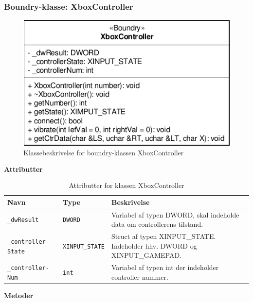 \subsubsection{Boundry-klasse: XboxController}

\begin{figure}[h]
\centering
\includegraphics[]{../fig/diagrammer/pc/cd_xboxcontroller.pdf}
\caption{Klassebeskrivelse for boundry-klassen XboxController}
\label{fig:cd_data}
\end{figure}

\textbf{Attributter}

\begin{table}[h]
\begin{tabularx}{\textwidth}{| Z | Z | L{10cm} |} \hline
Navn & Type & Beskrivelse \\\hline
\texttt{\_dwResult}				& \texttt{DWORD}		&Variabel af typen DWORD, skal indeholde data om controllerens tilstand.\\\hline

\texttt{\_controller- State}	& \texttt{XINPUT\_STATE}&Struct af typen XINPUT\_STATE. Indeholder hhv. DWORD og XINPUT\_GAMEPAD.\\\hline

\texttt{\_controller- Num}		& \texttt{int}			&Variabel af typen int der indeholder controller nummer.\\\hline
\end{tabularx}
\caption{Attributter for klassen XboxController}
\label{table:attr_xboxcontroller}
\end{table}


\textbf{Metoder}

